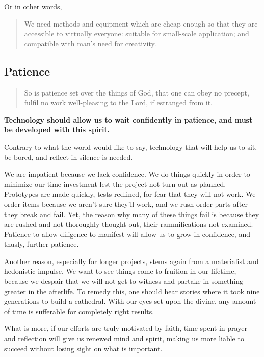 \documentclass[letterpaper]{article}
\begin{document}
Or in other words,

\begin{quote}
  We need methods and equipment which are cheap enough so that they are accessible to virtually everyone: suitable for small-scale application; and compatible with man's need for creativity.
\end{quote}

\subsection{Patience}

\begin{quote}
  So is patience set over the things of God, that one can obey no precept, fulfil no work well-pleasing to the Lord, if estranged from it.
\end{quote}

\textbf{Technology should allow us to wait confidently in patience, and must be developed with this spirit.}

Contrary to what the world would like to say, technology that will help us to sit, be bored, and reflect in silence is needed.

We are impatient because we lack confidence. We do things quickly in order to minimize our time investment lest the project not turn out as planned. Prototypes are made quickly, tests redlined, for fear that they will not work. We order items because we aren't sure they'll work, and we rush order parts after they break and fail. Yet, the reason why many of these things fail is because they are rushed and not thoroughly thought out, their rammifications not examined. Patience to allow diligence to manifest will allow us to grow in confidence, and thusly, further patience.

Another reason, especially for longer projects, stems again from a materialist and hedonistic impulse. We want to see things come to fruition in our lifetime, because we despair that we will not get to witness and partake in something greater in the afterlife. To remedy this, one should hear stories where it took nine generations to build a cathedral. With our eyes set upon the divine, any amount of time is sufferable for completely right results.

What is more, if our efforts are truly motivated by faith, time spent in prayer and reflection will give us renewed mind and spirit, making us more liable to succeed without losing sight on what is important.
\end{document}
